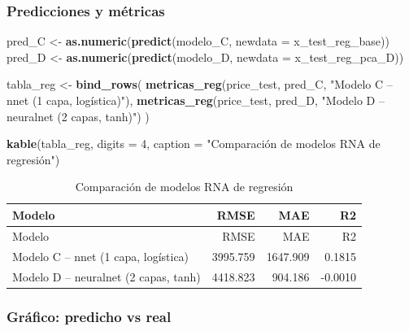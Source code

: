 \documentclass[
]{article}
\newenvironment{Shaded}{\begin{snugshade}}{\end{snugshade}}
\newcommand{\AttributeTok}[1]{\textcolor[rgb]{0.13,0.29,0.53}{#1}}
\newcommand{\DecValTok}[1]{\textcolor[rgb]{0.00,0.00,0.81}{#1}}
\newcommand{\FunctionTok}[1]{\textcolor[rgb]{0.13,0.29,0.53}{\textbf{#1}}}
\newcommand{\NormalTok}[1]{#1}
\newcommand{\OtherTok}[1]{\textcolor[rgb]{0.56,0.35,0.01}{#1}}
\newcommand{\StringTok}[1]{\textcolor[rgb]{0.31,0.60,0.02}{#1}}
\begin{document}
\hypertarget{predicciones-y-muxe9tricas}{%
\subsubsection{Predicciones y
métricas}\label{predicciones-y-muxe9tricas}}

\begin{Shaded}
\begin{Highlighting}[]
\NormalTok{pred\_C }\OtherTok{\textless{}{-}} \FunctionTok{as.numeric}\NormalTok{(}\FunctionTok{predict}\NormalTok{(modelo\_C, }\AttributeTok{newdata =}\NormalTok{ x\_test\_reg\_base))}
\NormalTok{pred\_D }\OtherTok{\textless{}{-}} \FunctionTok{as.numeric}\NormalTok{(}\FunctionTok{predict}\NormalTok{(modelo\_D, }\AttributeTok{newdata =}\NormalTok{ x\_test\_reg\_pca\_D))}

\NormalTok{tabla\_reg }\OtherTok{\textless{}{-}} \FunctionTok{bind\_rows}\NormalTok{(}
  \FunctionTok{metricas\_reg}\NormalTok{(price\_test, pred\_C, }\StringTok{"Modelo C – nnet (1 capa, logística)"}\NormalTok{),}
  \FunctionTok{metricas\_reg}\NormalTok{(price\_test, pred\_D, }\StringTok{"Modelo D – neuralnet (2 capas, tanh)"}\NormalTok{)}
\NormalTok{)}

\FunctionTok{kable}\NormalTok{(tabla\_reg, }\AttributeTok{digits =} \DecValTok{4}\NormalTok{, }\AttributeTok{caption =} \StringTok{"Comparación de modelos RNA de regresión"}\NormalTok{)}
\end{Highlighting}
\end{Shaded}

\begin{longtable}[]{@{}lrrr@{}}
\caption{Comparación de modelos RNA de regresión}\tabularnewline
\toprule\noalign{}
Modelo & RMSE & MAE & R2 \\
\midrule\noalign{}
\endfirsthead
\toprule\noalign{}
Modelo & RMSE & MAE & R2 \\
\midrule\noalign{}
\endhead
\bottomrule\noalign{}
\endlastfoot
Modelo C -- nnet (1 capa, logística) & 3995.759 & 1647.909 & 0.1815 \\
Modelo D -- neuralnet (2 capas, tanh) & 4418.823 & 904.186 & -0.0010 \\
\end{longtable}

\hypertarget{gruxe1fico-predicho-vs-real}{%
\subsubsection{Gráfico: predicho vs
real}\label{gruxe1fico-predicho-vs-real}}
\end{document}

